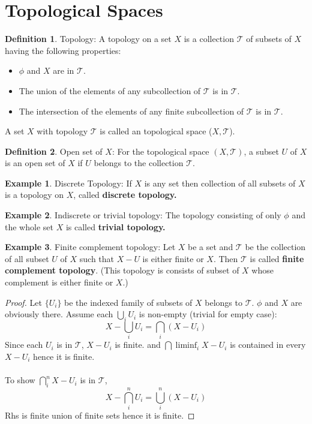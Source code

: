\documentclass[12pt,reqno]{amsart}
\theoremstyle{plain}
\theoremstyle{definition}
\newtheorem{defn}{Definition}
\newtheorem{eg}{Example}
\begin{document}
\section{Topological Spaces}
\begin{defn}
    Topology: A topology on a set $X$ is a collection $\mathcal T$ of subsets of $X$ having the following properties:
\begin{itemize}
    \item $\phi$ and $X$ are in $\mathcal T$.
    \item The union of the elements of any subcollection of $\mathcal T$ is in $\mathcal T$.
    \item The intersection of the elements of any finite subcollection of $\mathcal T$ is in $\mathcal T$.
\end{itemize}
\end{defn}
A set $X$ with topology $\mathcal T$ is called an topological space ($X,\mathcal T$).
\begin{defn}
    Open set of $X$: For the topological space $(X, \mathcal T)$, a subset $U$ of $X$ is an open set of $X$ if $U$ belongs to the collection $\mathcal T$.
\end{defn}
\begin{eg}
    Discrete Topology: If $X$ is any set then collection of all subsets of $X$ is a topology on $X$, called {\bf discrete topology.}
\end{eg}
\begin{eg}
    Indiscrete or trivial topology: The topology consisting of only $\phi$ and the whole set $X$ is called {\bf trivial topology.}
\end{eg}
\begin{eg}
    Finite complement topology: Let $X$ be a set and $\mathcal{T}$ be the collection of all subset $U$ of $X$ such that $X - U$ is either finite or $X$. Then $\mathcal{T}$ is called {\bf finite complement topology}. (This topology is consists of subset of $X$ whose complement is either finite or $X$.)
\end{eg}
\begin{proof}
    Let $\{U_{i}\}$ be the indexed family of subsets of $X$ belongs to $\mathcal{T}$. $\phi$ and $X$ are obviously there. Assume each $\bigcup\limits_i U_i$ is non-empty (trivial for empty case): 
    $$X - \bigcup\limits_i U_i = \bigcap\limits_i(X - U_i)$$
    Since each $U_i$ is in $\mathcal{T}$, $X - U_i$ is finite. and $\bigcap\liminf_i X - U_i$ is contained in every $X - U_i$ hence it is finite.\\ \\
    To show $\bigcap\limits_i^n X - U_i$ is in $\mathcal{T}$, 
    $$ X - \bigcap\limits_i^n U_i = \bigcup\limits_i^n (X - U_i) $$
    Rhs is finite union of finite sets hence it is finite.
\end{proof}
\end{document}
